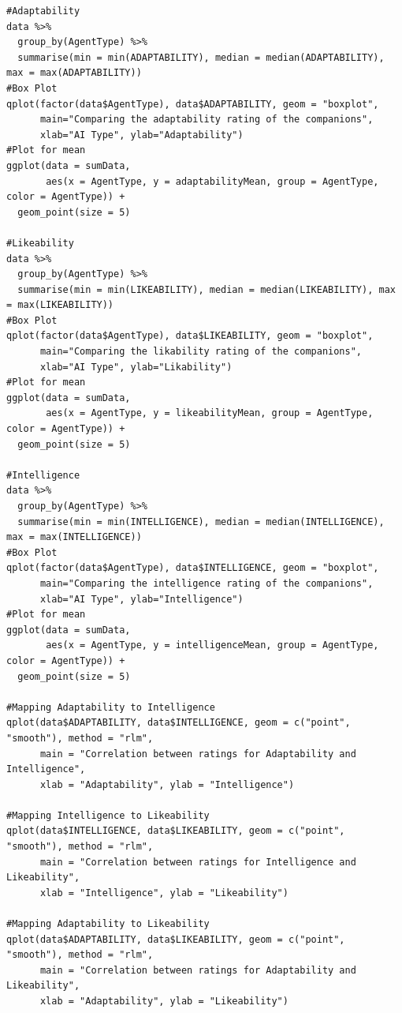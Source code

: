 \documentclass{IEEEtran}
\begin{document}
\begin{verbatim}
#Adaptability
data %>%
  group_by(AgentType) %>%
  summarise(min = min(ADAPTABILITY), median = median(ADAPTABILITY), max = max(ADAPTABILITY))
#Box Plot
qplot(factor(data$AgentType), data$ADAPTABILITY, geom = "boxplot", 
      main="Comparing the adaptability rating of the companions", 
      xlab="AI Type", ylab="Adaptability")
#Plot for mean
ggplot(data = sumData,
       aes(x = AgentType, y = adaptabilityMean, group = AgentType, color = AgentType)) +
  geom_point(size = 5)

#Likeability
data %>%
  group_by(AgentType) %>%
  summarise(min = min(LIKEABILITY), median = median(LIKEABILITY), max = max(LIKEABILITY))
#Box Plot
qplot(factor(data$AgentType), data$LIKEABILITY, geom = "boxplot", 
      main="Comparing the likability rating of the companions", 
      xlab="AI Type", ylab="Likability")
#Plot for mean
ggplot(data = sumData,
       aes(x = AgentType, y = likeabilityMean, group = AgentType, color = AgentType)) +
  geom_point(size = 5)

#Intelligence
data %>%
  group_by(AgentType) %>%
  summarise(min = min(INTELLIGENCE), median = median(INTELLIGENCE), max = max(INTELLIGENCE))
#Box Plot
qplot(factor(data$AgentType), data$INTELLIGENCE, geom = "boxplot", 
      main="Comparing the intelligence rating of the companions", 
      xlab="AI Type", ylab="Intelligence")
#Plot for mean
ggplot(data = sumData,
       aes(x = AgentType, y = intelligenceMean, group = AgentType, color = AgentType)) +
  geom_point(size = 5)

#Mapping Adaptability to Intelligence
qplot(data$ADAPTABILITY, data$INTELLIGENCE, geom = c("point", "smooth"), method = "rlm",
      main = "Correlation between ratings for Adaptability and Intelligence", 
      xlab = "Adaptability", ylab = "Intelligence")

#Mapping Intelligence to Likeability
qplot(data$INTELLIGENCE, data$LIKEABILITY, geom = c("point", "smooth"), method = "rlm",
      main = "Correlation between ratings for Intelligence and Likeability", 
      xlab = "Intelligence", ylab = "Likeability")

#Mapping Adaptability to Likeability
qplot(data$ADAPTABILITY, data$LIKEABILITY, geom = c("point", "smooth"), method = "rlm",
      main = "Correlation between ratings for Adaptability and Likeability", 
      xlab = "Adaptability", ylab = "Likeability")


\end{verbatim}
\end{document}
